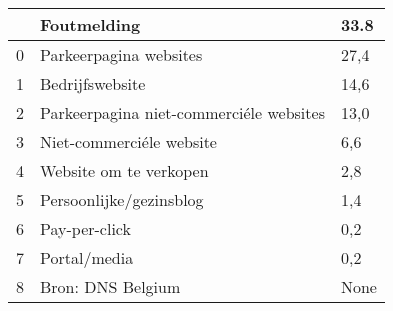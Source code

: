 \begin{tabular}{lll}
\toprule
{} &                              Foutmelding &  33.8 \\
\midrule
0 &                   Parkeerpagina websites &  27,4 \\
1 &                          Bedrijfswebsite &  14,6 \\
2 &  Parkeerpagina niet-commerciéle websites &  13,0 \\
3 &                 Niet-commerciéle website &   6,6 \\
4 &                   Website om te verkopen &   2,8 \\
5 &                  Persoonlijke/gezinsblog &   1,4 \\
6 &                            Pay-per-click &   0,2 \\
7 &                             Portal/media &   0,2 \\
8 &                        Bron: DNS Belgium &  None \\
\bottomrule
\end{tabular}

